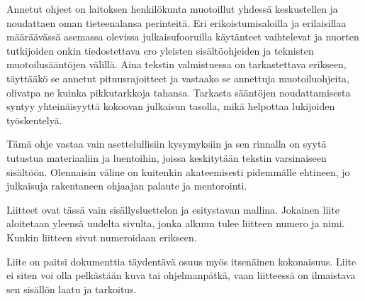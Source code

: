 \documentclass[finnish,gradu]{tktltiki}
\begin{document}
Annetut ohjeet on laitoksen henkilökunta muotoillut yhdessä keskustellen
ja noudattaen oman tieteenalansa perinteitä. Eri erikoistumisaloilla ja
erilaisillaa määräävässä asemassa olevissa julkaisufooruilla käytänteet
vaihtelevat ja nuorten tutkijoiden onkin tiedostettava ero yleisten
sisältöohjeiden ja teknisten muotoilusääntöjen välillä. Aina tekstin
valmistuessa on tarkastettava erikseen, täyttääkö se annetut
pituusrajoitteet ja vastaako se annettuja muotoiluohjeita, olivatpa ne
kuinka pikkutarkkoja tahansa. Tarkasta sääntöjen noudattamisesta syntyy
yhteinäisyyttä kokoovan julkaisun tasolla, mikä helpottaa lukijoiden
työskentelyä.

Tämä ohje vastaa vain asettelullisiin kysymyksiin ja sen rinnalla on
syytä tutustua materiaaliin ja luentoihin, joissa keskitytään tekstin
varsinaiseen sisältöön. Olennaisin väline on kuitenkin akateemisesti
pidemmälle ehtineen, jo julkaisuja rakentaneen ohjaajan palaute ja
mentorointi.


%


\nocite{*}
%
%


%



% 
%

\lastpage

\appendices

\pagestyle{empty}


Liitteet ovat tässä vain sisällysluettelon ja esitystavan mallina.
Jokainen liite aloitetaan yleensä uudelta sivulta, jonka alkuun tulee
liitteen numero ja nimi. Kunkin liitteen sivut numeroidaan erikseen.

Liite on paitsi dokumenttia täydentävä osuus myös itsenäinen
kokonaisuus. Liite ei siten voi olla pelkästään kuva tai ohjelmanpätkä,
vaan liitteessä on ilmaistava sen sisällön laatu ja tarkoitus.
\end{document}
